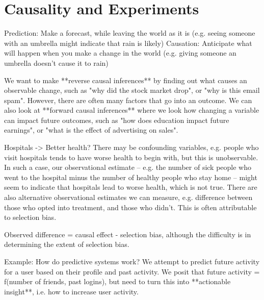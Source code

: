 \section*{Causality and Experiments}
\begin{flushleft}
Prediction: Make a forecast, while leaving the world as it is (e.g. seeing someone with an umbrella might indicate that rain is likely) 
Causation: Anticipate what will happen when you make a change in the world (e.g. giving someone an umbrella doesn't cause it to rain)
\end{flushleft}

\begin{flushleft}
We want to make **reverse causal inferences** by finding out what causes an observable change, such as "why did the stock market drop", or "why is this email spam". However, there are often many factors that go into an outcome. We can also look at **forward causal inferences** where we look how changing a variable can impact future outcomes, such as "how does education impact future earnings", or "what is the effect of advertising on sales".
\end{flushleft}

\begin{flushleft}
Hospitals -> Better health? There may be confounding variables, e.g. people who visit hospitals tends to have worse health to begin with, but this is unobservable. In such a case, our observational estimate -- e.g. the number of sick people who went to the hospital minus the number of healthy people who stay home -- might seem to indicate that hospitals lead to worse health, which is not true. There are also alternative observational estimates we can measure, e.g. difference between those who opted into treatment, and those who didn't. This is often attributable to selection bias.
\end{flushleft}

\begin{flushleft}
Observed difference = causal effect - selection bias, although the difficulty is in determining the extent of selection bias.
\end{flushleft}

\begin{flushleft}
Example: How do predictive systems work? We attempt to predict future activity for a user based on their profile and past activity. We posit that future activity = f(number of friends, past logins), but need to turn this into **actionable insight**, i.e. how to increase user activity.
\end{flushleft}

